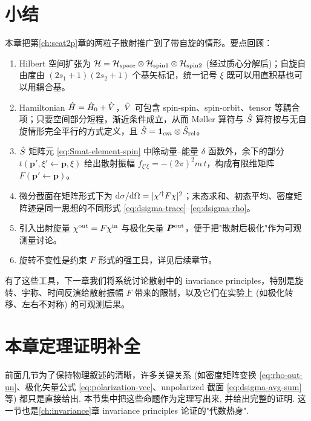 \section{小结}\label{sec:spin-summary}

本章把第\ref{ch:scat2p}章的两粒子散射推广到了带自旋的情形。要点回顾：
\begin{enumerate}
  \item Hilbert 空间扩张为 $\mathcal{H}=\mathcal{H}_{\rm space}\otimes \mathcal{H}_{\rm spin1}\otimes\mathcal{H}_{\rm spin2}$ (经过质心分解后)；自旋自由度由 $(2s_1+1)(2s_2+1)$ 个基矢标记，统一记号 $\xi$ 既可以用直积基也可以用耦合基。
  \item Hamiltonian $\hat{H}=\hat{H}_0+\hat{V}$，$\hat{V}$ 可包含 spin-spin、spin-orbit、tensor 等耦合项；只要空间部分短程，渐近条件成立，从而 Møller 算符与 $\hat{S}$ 算符按与无自旋情形完全平行的方式定义，且 $\hat{S}=\mathbf 1_{cm}\otimes\hat{S}_{\rm rel}$。
  \item $\hat{S}$ 矩阵元 \eqref{eq:Smat-element-spin} 中除动量--能量 $\delta$ 函数外，余下的部分 $t(\bm p',\xi'\!\leftarrow\!\bm p,\xi)$ 给出散射振幅 $f_{\xi'\xi}=-(2\pi)^2 m\,t$，构成有限维矩阵 $F(\bm p'\!\leftarrow\!\bm p)$。
  \item 微分截面在矩阵形式下为 $\mathrm{d}\sigma/\mathrm{d}\Omega=|\chi'^\dagger F\chi|^2$；末态求和、初态平均、密度矩阵迹是同一思想的不同形式 \eqref{eq:dsigma-trace}--\eqref{eq:dsigma-rho}。
  \item 引入出射旋量 $\chi^{\rm out}=F\chi^{\rm in}$ 与极化矢量 $\bm P^{\rm out}$，便于把"散射后极化"作为可观测量讨论。
  \item 旋转不变性是约束 $F$ 形式的强工具，详见后续章节。
\end{enumerate}
有了这些工具，下一章我们将系统讨论散射中的 invariance principles，特别是旋转、宇称、时间反演给散射振幅 $F$ 带来的限制，以及它们在实验上 (如极化转移、左右不对称) 的可观测后果。

\section{本章定理证明补全}\label{sec:spin2p-proofs}

前面几节为了保持物理叙述的清晰，许多关键关系 (如密度矩阵变换 \eqref{eq:rho-out-un}、极化矢量公式 \eqref{eq:polarization-vec}、unpolarized 截面 \eqref{eq:dsigma-avg-sum} 等) 都只是直接给出. 本节集中把这些命题作为定理写出来, 并给出完整的证明. 这一节也是\eqref{ch:invariance}章 invariance principles 论证的"代数热身".

